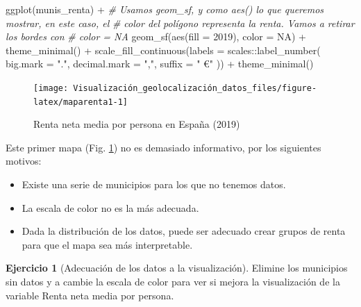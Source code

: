 \documentclass[
]{book}
\newenvironment{Shaded}{\begin{snugshade}}{\end{snugshade}}
\newcommand{\AttributeTok}[1]{\textcolor[rgb]{0.77,0.63,0.00}{#1}}
\newcommand{\CommentTok}[1]{\textcolor[rgb]{0.56,0.35,0.01}{\textit{#1}}}
\newcommand{\ConstantTok}[1]{\textcolor[rgb]{0.00,0.00,0.00}{#1}}
\newcommand{\FunctionTok}[1]{\textcolor[rgb]{0.00,0.00,0.00}{#1}}
\newcommand{\NormalTok}[1]{#1}
\newcommand{\SpecialCharTok}[1]{\textcolor[rgb]{0.00,0.00,0.00}{#1}}
\newcommand{\StringTok}[1]{\textcolor[rgb]{0.31,0.60,0.02}{#1}}
\theoremstyle{definition}
\theoremstyle{definition}
\theoremstyle{definition}
\newtheorem{exercise}{Ejercicio}[chapter]
\theoremstyle{definition}
\theoremstyle{remark}
\begin{document}
\begin{Shaded}
\begin{Highlighting}[]

\FunctionTok{ggplot}\NormalTok{(munis\_renta) }\SpecialCharTok{+}
  \CommentTok{\# Usamos geom\_sf, y como aes() lo que queremos mostrar, en este caso, el}
  \CommentTok{\# color del polígono representa la renta. Vamos a retirar los bordes con}
  \CommentTok{\# color = NA}
  \FunctionTok{geom\_sf}\NormalTok{(}\FunctionTok{aes}\NormalTok{(}\AttributeTok{fill =} \StringTok{\textasciigrave{}}\AttributeTok{2019}\StringTok{\textasciigrave{}}\NormalTok{), }\AttributeTok{color =} \ConstantTok{NA}\NormalTok{) }\SpecialCharTok{+}
  \FunctionTok{theme\_minimal}\NormalTok{() }\SpecialCharTok{+}
  \FunctionTok{scale\_fill\_continuous}\NormalTok{(}\AttributeTok{labels =}\NormalTok{ scales}\SpecialCharTok{::}\FunctionTok{label\_number}\NormalTok{(}
    \AttributeTok{big.mark =} \StringTok{"."}\NormalTok{,}
    \AttributeTok{decimal.mark =} \StringTok{","}\NormalTok{,}
    \AttributeTok{suffix =} \StringTok{" €"}
\NormalTok{  )) }\SpecialCharTok{+}
  \FunctionTok{theme\_minimal}\NormalTok{()}
\end{Highlighting}
\end{Shaded}

\begin{figure}

{\centering \texttt{[image: Visualización\_geolocalización\_datos\_files/figure-latex/maparenta1-1]} 

}

\caption{Renta neta media por persona en España (2019)}\label{fig:maparenta1}
\end{figure}

Este primer mapa (Fig. \ref{fig:maparenta1}) no es demasiado informativo, por
los siguientes motivos:

\begin{itemize}
\item
  Existe una serie de municipios para los que no tenemos datos.
\item
  La escala de color no es la más adecuada.
\item
  Dada la distribución de los datos, puede ser adecuado crear grupos de renta
  para que el mapa sea más interpretable.
\end{itemize}

\begin{exercise}[Adecuación de los datos a la visualización]
\protect\hypertarget{exr:ex21}{}\label{exr:ex21}Elimine los municipios sin datos y a cambie la escala de color para ver si
mejora la visualización de la variable Renta neta media por persona.
\end{exercise}
\end{document}
